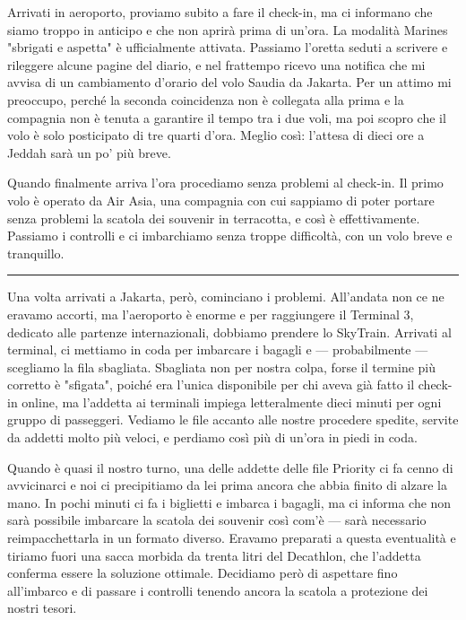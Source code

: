 Arrivati in aeroporto, proviamo subito a fare il check-in, ma ci informano che siamo troppo in anticipo e che non aprirà prima di un'ora. La modalità Marines "sbrigati e aspetta" è ufficialmente attivata. Passiamo l'oretta seduti a scrivere e rileggere alcune pagine del diario, e nel frattempo ricevo una notifica che mi avvisa di un cambiamento d'orario del volo Saudia da Jakarta. Per un attimo mi preoccupo, perché la seconda coincidenza non è collegata alla prima e la compagnia non è tenuta a garantire il tempo tra i due voli, ma poi scopro che il volo è solo posticipato di tre quarti d'ora. Meglio così: l'attesa di dieci ore a Jeddah sarà un po' più breve.

Quando finalmente arriva l'ora procediamo senza problemi al check-in. Il primo volo è operato da Air Asia, una compagnia con cui sappiamo di poter portare senza problemi la scatola dei souvenir in terracotta, e così è effettivamente. Passiamo i controlli e ci imbarchiamo senza troppe difficoltà, con un volo breve e tranquillo.

\begin{center}
    \noindent\rule{0.6\textwidth}{0.4pt}
\end{center}

Una volta arrivati a Jakarta, però, cominciano i problemi. All'andata non ce ne eravamo accorti, ma l'aeroporto è enorme e per raggiungere il Terminal 3, dedicato alle partenze internazionali, dobbiamo prendere lo SkyTrain. Arrivati al terminal, ci mettiamo in coda per imbarcare i bagagli e — probabilmente — scegliamo la fila sbagliata. Sbagliata non per nostra colpa, forse il termine più corretto è "sfigata", poiché era l'unica disponibile per chi aveva già fatto il check-in online, ma l'addetta ai terminali impiega letteralmente dieci minuti per ogni gruppo di passeggeri. Vediamo le file accanto alle nostre procedere spedite, servite da addetti molto più veloci, e perdiamo così più di un'ora in piedi in coda.

Quando è quasi il nostro turno, una delle addette delle file Priority ci fa cenno di avvicinarci e noi ci precipitiamo da lei prima ancora che abbia finito di alzare la mano. In pochi minuti ci fa i biglietti e imbarca i bagagli, ma ci informa che non sarà possibile imbarcare la scatola dei souvenir così com'è — sarà necessario reimpacchettarla in un formato diverso. Eravamo preparati a questa eventualità e tiriamo fuori una sacca morbida da trenta litri del Decathlon, che l'addetta conferma essere la soluzione ottimale. Decidiamo però di aspettare fino all'imbarco e di passare i controlli tenendo ancora la scatola a protezione dei nostri tesori.

